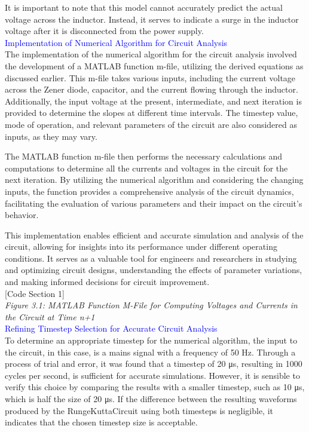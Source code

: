 It is important to note that this model cannot accurately predict the actual voltage across the inductor. Instead, it serves to indicate a surge in the inductor voltage after it is disconnected from the power supply.\\

\textcolor{blue}{Implementation of Numerical Algorithm for Circuit Analysis}\\

The implementation of the numerical algorithm for the circuit analysis involved the development of a MATLAB function m-file, utilizing the derived equations as discussed earlier. This m-file takes various inputs, including the current voltage across the Zener diode, capacitor, and the current flowing through the inductor. Additionally, the input voltage at the present, intermediate, and next iteration is provided to determine the slopes at different time intervals. The timestep value, mode of operation, and relevant parameters of the circuit are also considered as inputs, as they may vary.

The MATLAB function m-file then performs the necessary calculations and computations to determine all the currents and voltages in the circuit for the next iteration. By utilizing the numerical algorithm and considering the changing inputs, the function provides a comprehensive analysis of the circuit dynamics, facilitating the evaluation of various parameters and their impact on the circuit's behavior.

This implementation enables efficient and accurate simulation and analysis of the circuit, allowing for insights into its performance under different operating conditions. It serves as a valuable tool for engineers and researchers in studying and optimizing circuit designs, understanding the effects of parameter variations, and making informed decisions for circuit improvement.\\

[Code Section 1]\\

\emph{Figure 3.1: MATLAB Function M-File for Computing Voltages and Currents in the Circuit at Time n+1}\\

\textcolor{blue}{Refining Timestep Selection for Accurate Circuit Analysis}\\


To determine an appropriate timestep for the numerical algorithm, the input to the circuit, in this case, is a mains signal with a frequency of 50 Hz. Through a process of trial and error, it was found that a timestep of 20 μs, resulting in 1000 cycles per second, is sufficient for accurate simulations. However, it is sensible to verify this choice by comparing the results with a smaller timestep, such as 10 μs, which is half the size of 20 μs. If the difference between the resulting waveforms produced by the RungeKuttaCircuit using both timesteps is negligible, it indicates that the chosen timestep size is acceptable.

